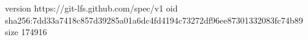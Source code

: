 version https://git-lfs.github.com/spec/v1
oid sha256:7dd33a7418c857d39285a01a6dc4fd4194c73272df96ee87301332083fc74b89
size 174916
